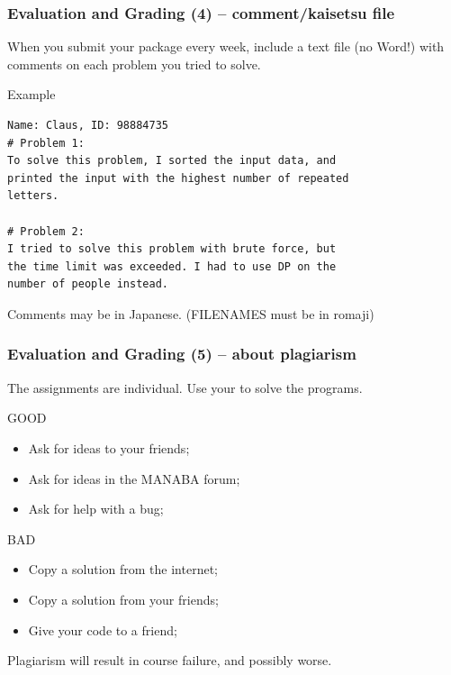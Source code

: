 \documentclass{beamer}
\begin{document}
\begin{frame}[fragile]
  \frametitle{Evaluation and Grading (4) -- comment/kaisetsu file}

  When you submit your package every week, include a text file (no
  Word!) with comments on each problem you tried to solve.
    
  \begin{exampleblock}{Example}
    {\smaller
\begin{verbatim}
Name: Claus, ID: 98884735
# Problem 1:
To solve this problem, I sorted the input data, and 
printed the input with the highest number of repeated 
letters.

# Problem 2: 
I tried to solve this problem with brute force, but 
the time limit was exceeded. I had to use DP on the 
number of people instead.
\end{verbatim}}
  \end{exampleblock}

  \bigskip
  
  Comments may be in Japanese. {\small (FILENAMES must be in romaji)}
\end{frame}

\begin{frame}
  \frametitle{Evaluation and Grading (5) -- about plagiarism}
  
  The assignments are \alert{individual}. Use your  to solve the programs.

  \begin{exampleblock}{GOOD}
    \begin{itemize}
    \item Ask for ideas to your friends;
    \item Ask for ideas in the MANABA forum;
    \item Ask for help with a bug;
    \end{itemize}
  \end{exampleblock}

  \begin{alertblock}{BAD}
    \begin{itemize}
    \item Copy a solution from the internet;
    \item Copy a solution from your friends;
    \item Give your code to a friend;
    \end{itemize}
  \end{alertblock}

  Plagiarism will result in course failure, and possibly worse.
\end{frame}
\end{document}

